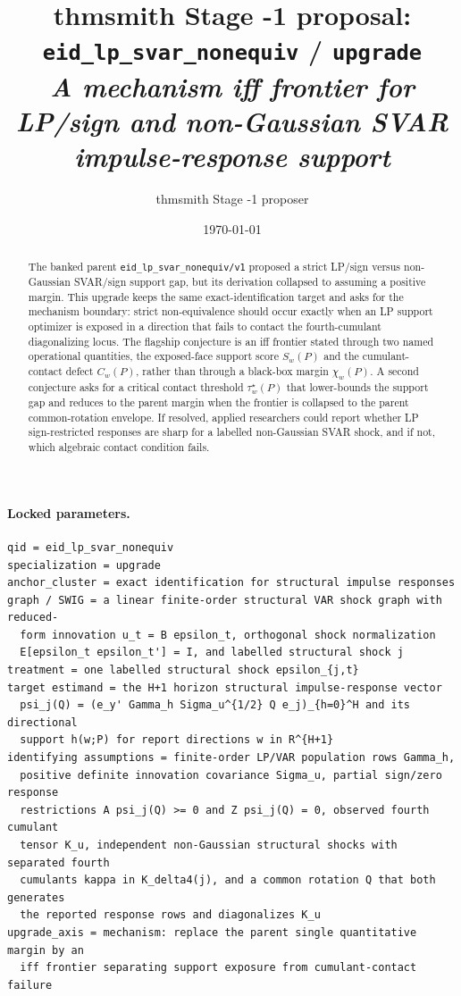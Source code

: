 \documentclass[11pt]{article}
\title{thmsmith Stage -1 proposal: \texttt{eid\_lp\_svar\_nonequiv} / \texttt{upgrade}%
  \\ \large\textit{A mechanism iff frontier for LP/sign and non-Gaussian SVAR impulse-response support}}
\author{thmsmith Stage -1 proposer}
\date{\today}
\theoremstyle{definition}
\theoremstyle{plain}
\theoremstyle{remark}
\begin{document}
\maketitle


\paragraph{Locked parameters.}
\begin{verbatim}
qid = eid_lp_svar_nonequiv
specialization = upgrade
anchor_cluster = exact identification for structural impulse responses
graph / SWIG = a linear finite-order structural VAR shock graph with reduced-
  form innovation u_t = B epsilon_t, orthogonal shock normalization
  E[epsilon_t epsilon_t'] = I, and labelled structural shock j
treatment = one labelled structural shock epsilon_{j,t}
target estimand = the H+1 horizon structural impulse-response vector
  psi_j(Q) = (e_y' Gamma_h Sigma_u^{1/2} Q e_j)_{h=0}^H and its directional
  support h(w;P) for report directions w in R^{H+1}
identifying assumptions = finite-order LP/VAR population rows Gamma_h,
  positive definite innovation covariance Sigma_u, partial sign/zero response
  restrictions A psi_j(Q) >= 0 and Z psi_j(Q) = 0, observed fourth cumulant
  tensor K_u, independent non-Gaussian structural shocks with separated fourth
  cumulants kappa in K_delta4(j), and a common rotation Q that both generates
  the reported response rows and diagonalizes K_u
upgrade_axis = mechanism: replace the parent single quantitative margin by an
  iff frontier separating support exposure from cumulant-contact failure
\end{verbatim}

\begin{abstract}
The banked parent \texttt{eid\_lp\_svar\_nonequiv/v1} proposed a strict LP/sign versus non-Gaussian SVAR/sign support gap, but its derivation collapsed to assuming a positive margin.  This upgrade keeps the same exact-identification target and asks for the mechanism boundary: strict non-equivalence should occur exactly when an LP support optimizer is exposed in a direction that fails to contact the fourth-cumulant diagonalizing locus.  The flagship conjecture is an iff frontier stated through two named operational quantities, the exposed-face support score \(S_w(P)\) and the cumulant-contact defect \(C_w(P)\), rather than through a black-box margin \(\chi_w(P)\).  A second conjecture asks for a critical contact threshold \(\tau_w^\star(P)\) that lower-bounds the support gap and reduces to the parent margin when the frontier is collapsed to the parent common-rotation envelope.  If resolved, applied researchers could report whether LP sign-restricted responses are sharp for a labelled non-Gaussian SVAR shock, and if not, which algebraic contact condition fails.
\end{abstract}
\end{document}
